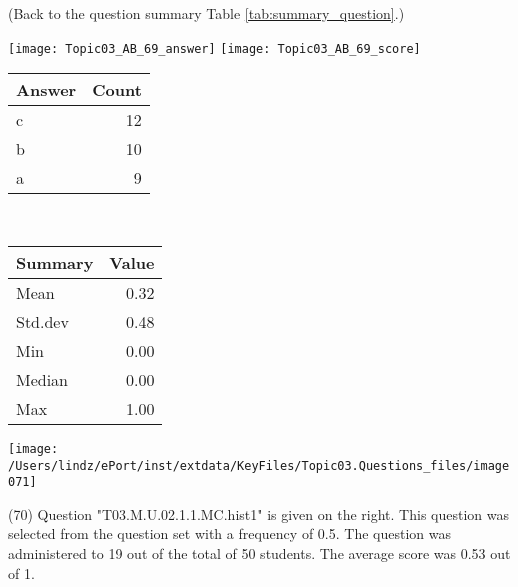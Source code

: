 \documentclass[12pt,english,nohyper]{tufte-handout}\usepackage[]{graphicx}\usepackage[]{color}
\begin{document}
 (Back to the question summary Table \ref{tab:summary_question}.)

\begin{center} \texttt{[image: Topic03\_AB\_69\_answer]} \texttt{[image: Topic03\_AB\_69\_score]} \end{center} 

\begin{center}%
\begin{tabular}{lr}
  \hline
Answer & Count \\ 
  \hline
c &  12 \\ 
  b &  10 \\ 
  a &   9 \\ 
   \hline
\end{tabular}
~~~~~~~~%
\begin{tabular}{lr}
  \hline
Summary & Value \\ 
  \hline
Mean & 0.32 \\ 
  Std.dev & 0.48 \\ 
  Min & 0.00 \\ 
  Median & 0.00 \\ 
  Max & 1.00 \\ 
   \hline
\end{tabular}
\end{center}\newpage{}



\vspace{4cm}\begin{marginfigure}\texttt{[image: /Users/lindz/ePort/inst/extdata/KeyFiles/Topic03.Questions\_files/image071]}\end{marginfigure}\vspace{-4cm} (70) Question "T03.M.U.02.1.1.MC.hist1" is given on the right. This question was selected from the question set with a frequency of 0.5. The question was administered to 19 out of the total of 50 students. The average score was 0.53 out of 1.
\end{document}
